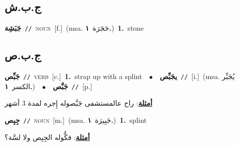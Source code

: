 \documentclass[10pt,a4paper,twoside]{article} %
\begin{document}
\begin{multicols}{2}
{\vspace{-3mm}
\subsection*{\color{blue}\foreignlanguage{arabic}{ج.ب.ش}\color{blue}{}} 

{\setlength\topsep{0pt}\textbf{\foreignlanguage{arabic}{جَبَشِة}}\ {\color{gray}\texttt{//}\color{black}}\ \textsc{noun}\ [f.]\ \color{gray}(msa. \foreignlanguage{arabic}{حَجَرَة}~\foreignlanguage{arabic}{\textbf{١.}})\color{black}\ \textbf{1.}~stone\ 

\vspace{-3mm}
\subsection*{\color{blue}\foreignlanguage{arabic}{ج.ب.ص}\color{blue}{}} 

{\setlength\topsep{0pt}\textbf{\foreignlanguage{arabic}{جَبِّص}}\ {\color{gray}\texttt{//}\color{black}}\ \textsc{verb}\ [c.]\ \textbf{1.}~strap up with a splint\ \ $\bullet$\ \ \setlength\topsep{0pt}\textbf{\foreignlanguage{arabic}{يجَبِّص}}\ {\color{gray}\texttt{//}\color{black}}\ [i.]\ \color{gray}(msa. \foreignlanguage{arabic}{يُجَبِّر الكسر}~\foreignlanguage{arabic}{\textbf{١.}})\color{black}\ \ $\bullet$\ \ \setlength\topsep{0pt}\textbf{\foreignlanguage{arabic}{جَبَّص}}\ {\color{gray}\texttt{//}\color{black}}\ [p.]\  \begin{flushright}\color{gray}\foreignlanguage{arabic}{\textbf{\underline{\foreignlanguage{arabic}{أمثلة}}}: راح عالمستشفى جَبَّصوله إِجره لمدة 3 أشهر}\end{flushright}\color{black}} \vspace{2mm}

{\setlength\topsep{0pt}\textbf{\foreignlanguage{arabic}{جِبِص}}\ {\color{gray}\texttt{//}\color{black}}\ \textsc{noun}\ [m.]\ \color{gray}(msa. \foreignlanguage{arabic}{جَبِيرَة}~\foreignlanguage{arabic}{\textbf{١.}})\color{black}\ \textbf{1.}~splint\  \begin{flushright}\color{gray}\foreignlanguage{arabic}{\textbf{\underline{\foreignlanguage{arabic}{أمثلة}}}: فكُّوله الجِبِص ولا لسَّة؟}\end{flushright}\color{black}} \vspace{2mm}

}}
\end{multicols}
\end{document}
